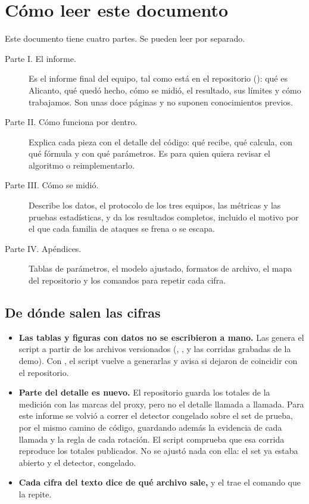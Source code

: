 \section*{Cómo leer este documento}

Este documento tiene cuatro partes. Se pueden leer por separado.

\begin{description}
  \item[Parte I. El informe.] Es el informe final del equipo, tal como está en el repositorio
    (): qué es Alicanto, qué quedó hecho, cómo se midió, el resultado, sus
    límites y cómo trabajamos. Son unas doce páginas y no suponen conocimientos previos.
  \item[Parte II. Cómo funciona por dentro.] Explica cada pieza con el detalle del código: qué recibe,
    qué calcula, con qué fórmula y con qué parámetros. Es para quien quiera revisar el algoritmo o
    reimplementarlo.
  \item[Parte III. Cómo se midió.] Describe los datos, el protocolo de los tres equipos, las métricas y
    las pruebas estadísticas, y da los resultados completos, incluido el motivo por el que cada familia
    de ataques se frena o se escapa.
  \item[Parte IV. Apéndices.] Tablas de parámetros, el modelo ajustado, formatos de archivo, el mapa
    del repositorio y los comandos para repetir cada cifra.
\end{description}

\subsection*{De dónde salen las cifras}

\begin{itemize}
  \item \textbf{Las tablas y figuras con datos no se escribieron a mano.} Las genera el script
     a partir de los archivos versionados (,
    ,  y las corridas grabadas de la demo). Con , el script
    vuelve a generarlas y avisa si dejaron de coincidir con el repositorio.
  \item \textbf{Parte del detalle es nuevo.} El repositorio guarda los totales de la medición con las
    marcas del proxy, pero no el detalle llamada a llamada. Para este informe se volvió a correr el
    detector congelado sobre el set de prueba, por el mismo camino de código, guardando además la
    evidencia de cada llamada y la regla de cada rotación. El script comprueba que esa corrida
    reproduce los totales publicados. No se ajustó nada con ella: el set ya estaba abierto y el
    detector, congelado.
  \item \textbf{Cada cifra del texto dice de qué archivo sale,} y el  trae el comando
    que la repite.
\end{itemize}

